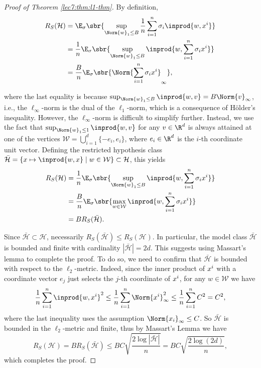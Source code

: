 \begin{proof}[Proof of Theorem \ref{lec7:thm:l1-thm}]
    By definition,
    \begin{align}
        R_S(\mathcal{H}) &= \E_\sigma\sbr{ \sup_{\Norm{w}_1 \le B} \frac{1}{n} \sum_{i=1}^n\sigma_i \inprod{w,x\sp{i}} } \\
        &= \frac{1}{n} \E_\sigma\sbr{ \sup_{\Norm{w}_1\le B} \inprod{w,\sum_{i=1}^n\sigma_i x\sp{i}} } \\
        &= \frac{B}{n} \E_\sigma\sbr{ \Norm{\sum_{i=1}^n \sigma_i  x\sp{i}}_\infty  },
    \end{align}
    
    where the last equality is because $\sup_{\Norm{w}_1 \leq B}\inprod{w,v} = B\Norm{v}_\infty$, i.e., the $\ell_\infty$-norm is the dual of the $\ell_1$-norm, which is a consequence of H\"older's inequality. However, the $\ell_\infty$-norm is difficult to simplify further. Instead, we use the fact that $\sup_{\Norm{w}_1 \leq 1} \inprod{w,v}$ for any $v \in \R^d$ is always attained at one of the vertices $\mathcal{W} = \bigcup_{i=1}^d \{-e_i,e_i\}$, where $e_i \in \R^d$ is the $i$-th coordinate unit vector. Defining the restricted hypothesis class $\bar{\mathcal{H}} = \{x \mapsto \inprod{w,x} \mid w \in \mathcal{W}\} \subset \mathcal{H}$, this yields
    \begin{align}
        R_S(\mathcal{H}) &= \frac{1}{n} \E_\sigma\sbr{ \sup_{\Norm{w}_1 \le B} \inprod{w,\sum_{i=1}^n\sigma_i x\sp{i}} } \\
        &= \frac{B}{n} \E_\sigma\sbr{ \max_{w\in\mathcal{W}} \inprod{w,\sum_{i=1}^n\sigma_i x\sp{i}} } \\
        &= BR_S(\bar{\mathcal{H}}).
    \end{align}
    
    Since $\bar{\mathcal{H}}\subset{\mathcal{H}}$, necessarily $R_S(\bar{\mathcal{H}})\leq R_S(\mathcal{H})$. In particular, the model class $\bar{\mathcal{H}}$ is bounded and finite with cardinality $|\bar{\mathcal{H}}| = 2d$. This suggests using Massart's lemma to complete the proof. To do so, we need to confirm that $\mathcal{\bar{H}}$ is bounded with respect to the $\ell_2$-metric. Indeed, since the inner product of $x\sp{i}$ with a coordinate vector $e_j$ just selects the $j$-th coordinate of $x\sp{i}$, for any $w \in \mathcal{W}$ we have
    \begin{equation}
        \frac{1}{n}\sum_{i=1}^n \inprod{w,x\sp{i}}^2 \leq \frac{1}{n}\sum_{i=1}^n \Norm{x\sp{i}}^2_\infty \leq \frac{1}{n}\sum_{i=1}^n C^2 = C^2,
    \end{equation}
    where the last inequality uses the assumption $\Norm{x_i}_\infty \leq C$. So $\bar{\mathcal{H}}$ is bounded in the $\ell_2$-metric and finite, thus by Massart's Lemma we have
    \begin{equation}
        R_S(\mathcal{H}) = B R_S(\bar{\mathcal{H}}) \leq BC\sqrt{\frac{2\log|\bar{\mathcal{H}}|}{n}} = BC\sqrt{\frac{2\log(2d)}{n}},
    \end{equation}
    which completes the proof.
\end{proof}

